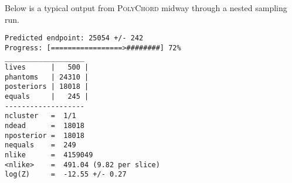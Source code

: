 \documentclass[10pt, twocolumn]{article}
\begin{document}
Below is a typical output from \textsc{PolyChord} midway through a nested sampling run.
\begin{verbatim}
Predicted endpoint: 25054 +/- 242
Progress: [=================>########] 72%
___________________
lives      |   500 |
phantoms   | 24310 |
posteriors | 18018 |
equals     |   245 |
-------------------
ncluster   =  1/1
ndead      =  18018
nposterior =  18018
nequals    =  249
nlike      =  4159049
<nlike>    =  491.04 (9.82 per slice)
log(Z)     =  -12.55 +/- 0.27
\end{verbatim}
\end{document}
